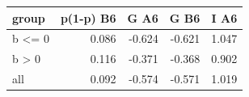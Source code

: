 \begin{tabular}{lrrrr}
\toprule
group & p(1-p) B6 & G A6 & G B6 & I A6 \\
\midrule
b <= 0 & 0.086 & -0.624 & -0.621 & 1.047 \\
b > 0 & 0.116 & -0.371 & -0.368 & 0.902 \\
all & 0.092 & -0.574 & -0.571 & 1.019 \\
\bottomrule
\end{tabular}

